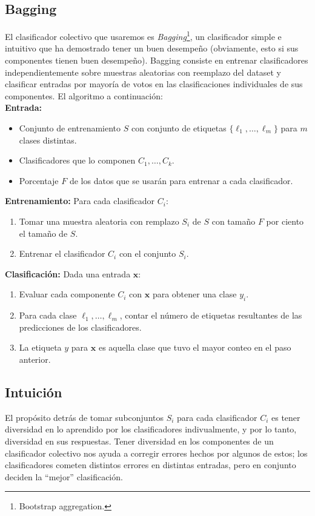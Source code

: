 \documentclass[spanish,11pt,letterpaper]{article}
\renewcommand{\vec}[1]{\mathbf{#1}}
\begin{document}
\subsection{Bagging}

El clasificador colectivo que usaremos es \textit{Bagging}\footnote{Bootstrap
aggregation.}, un clasificador simple e intuitivo que ha demostrado tener un buen
desempeño (obviamente, esto si sus componentes tienen buen desempeño). Bagging
consiste en entrenar clasificadores independientemente sobre muestras aleatorias
con reemplazo del dataset y clasificar entradas por mayoría de votos en las
clasificaciones individuales de sus componentes. El algoritmo a continuación:\\
\textbf{Entrada:}
\begin{itemize}
  \item Conjunto de entrenamiento $S$ con conjunto de etiquetas
  $\{\ell_1,\ldots,\ell_m\}$ para $m$ clases distintas.
  \item Clasificadores que lo componen $C_1,\ldots,C_k$.
  \item Porcentaje $F$ de los datos que se usarán para entrenar a cada clasificador.
\end{itemize}
\textbf{Entrenamiento:} Para cada clasificador $C_i$:
\begin{enumerate}
  \item Tomar una muestra aleatoria con remplazo $S_i$ de $S$ con tamaño $F$ por
  ciento el tamaño de $S$.
  \item Entrenar el clasificador $C_i$ con el conjunto $S_i$.
\end{enumerate}
\textbf{Clasificación:} Dada una entrada $\vec{x}$:
\begin{enumerate}
  \item Evaluar cada componente $C_i$ con $\vec{x}$ para obtener una clase $y_i$.
  \item Para cada clase $\ell_1,\ldots,\ell_m$, contar el número de etiquetas
  resultantes de las predicciones de los clasificadores.
  \item La etiqueta $y$ para $\vec{x}$ es aquella clase que tuvo el mayor conteo
  en el paso anterior.
\end{enumerate}

\subsection{Intuición}

El propósito detrás de tomar subconjuntos $S_i$ para cada clasificador $C_i$ es
tener diversidad en lo aprendido por los clasificadores indivualmente, y por lo
tanto, diversidad en sus respuestas. Tener diversidad en los componentes de un
clasificador colectivo nos ayuda a corregir errores hechos por algunos de estos;
los clasificadores cometen distintos errores en distintas entradas, pero en conjunto
deciden la ``mejor'' clasificación.
\end{document}
